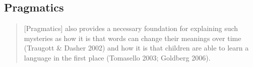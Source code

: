 \subsection{Pragmatics}
\begin{quote}
    [Pragmatics] also provides a necessary foundation for explaining such mysteries as how it is that words can change their meanings over time (Traugott \& Dasher 2002) and how it is that children are able to learn a language in the first place (Tomasello 2003; Goldberg 2006).\cite[17]{Israel2011}
\end{quote}